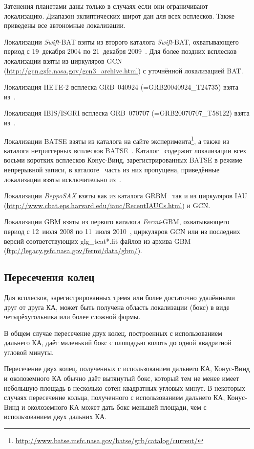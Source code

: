 Затенения планетами даны только в случаях если они ограничивают локализацию. 
Диапазон эклиптических широт дан для всех всплесков. Также приведены все автономные 
локализации.

Локализации \textit{Swift}-BAT взяты из второго каталога \textit{Swift}-BAT, 
охватывающего период с 19~декабря 2004 по 21~декабря 2009~\citep{Sakamoto_2011ApJS}. 
Для более поздних всплесков локализации взяты из циркуляров GCN 
(\url{http://gcn.gsfc.nasa.gov/gcn3_archive.html}) с уточнённой локализацией BAT.

Локализация HETE-2 всплеска GRB~040924 (=GRB20040924\_T24735) взята из~\citep{Arimoto_2006GCN}.

Локализация IBIS/ISGRI всплеска GRB~070707 (=GRB20070707\_T58122) взята из~\citep{Gotz_2007GCN}.

Локализации BATSE взяты из каталога на сайте 
эксперимента\footnote{\url{http://www.batse.msfc.nasa.gov/batse/grb/catalog/current/}}, 
а также из каталога нетриггерных всплесков BATSE~\citep{Kommers_2000ApJ, Stern_2001ApJ}. 
Каталог~\citep{Stern_2001ApJ} содержит локализации всех восьми коротких всплесков Конус-Винд, 
зарегистрированных BATSE в режиме непрерывной записи, в каталоге~\citep{Kommers_2000ApJ} часть из них пропущена, 
приведённые локализации взяты исключительно из~\citep{Stern_2001ApJ}.

Локализации \textit{BeppoSAX} взяты как из каталога GRBM~\citep{Frontera_2009ApJS} 
так и из циркуляров IAU (\url{http://www.cbat.eps.harvard.edu/iauc/RecentIAUCs.html}) 
и GCN. 

Локализации GBM взяты из первого каталога \textit{Fermi}-GBM, охватывающего период с
12~июля 2008 по 11~июля 2010~\citep{Paciesas_2012ApJS}, циркуляров GCN или из последних 
версий соответствующих glg\_tcat*.fit файлов из архива GBM 
(\url{ftp://legacy.gsfc.nasa.gov/fermi/data/gbm/}).

\subsection{Пересечения колец}
Для всплесков, зарегистрированных тремя или более достаточно удалёнными друг от 
друга КА, может быть получена область локализации (бокс) в виде четырёхугольника 
или более сложной формы.

В общем случае пересечение двух колец, построенных с использованием дальнего КА,
даёт маленький бокс с площадью вплоть до одной квадратной угловой минуты.

Пересечение двух колец, полученных с использованием дальнего КА, Конус-Винд и
околоземного КА обычно даёт вытянутый бокс, который тем не менее имеет небольшую
площадь в несколько сотен квадратных угловых минут. В некоторых случаях пересечение кольца, полученного
с использованием дальнего КА, Конус-Винд и околоземного КА может дать бокс меньшей
площади, чем с использованием двух дальних КА.

